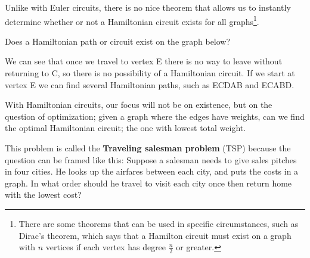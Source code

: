 Unlike with Euler circuits, there is no nice theorem that allows us to instantly determine whether or not a Hamiltonian circuit exists for all graphs\footnote{There are some theorems that can be used in specific circumstances, such as Dirac's theorem, which says that a Hamilton circuit must exist on a graph with $n$ vertices if each vertex has degree $\frac{n}{2}$ or greater.}.  

\begin{example}{} %
Does a Hamiltonian path or circuit exist on the graph below?\\


We can see that once we travel to vertex E there is no way to leave without returning to C, so there is no possibility of a Hamiltonian circuit.  If we start at vertex E we can find several Hamiltonian paths, such as ECDAB and ECABD.
\end{example}

With Hamiltonian circuits, our focus will not be on existence, but on the question of optimization; given a graph where the edges have weights, can we find the optimal Hamiltonian circuit; the one with lowest total weight.\\
\begin{minipage}{0.5\textwidth}
This problem is called the \textbf{Traveling salesman problem} (TSP) because the question can be framed like this:  Suppose a salesman needs to give sales pitches in four cities.  He looks up the airfares between each city, and puts the costs in a graph.  In what order should he travel to visit each city once then return home with the lowest cost? 
\end{minipage}
%
\begin{minipage}{0.5\textwidth}
\end{minipage}

